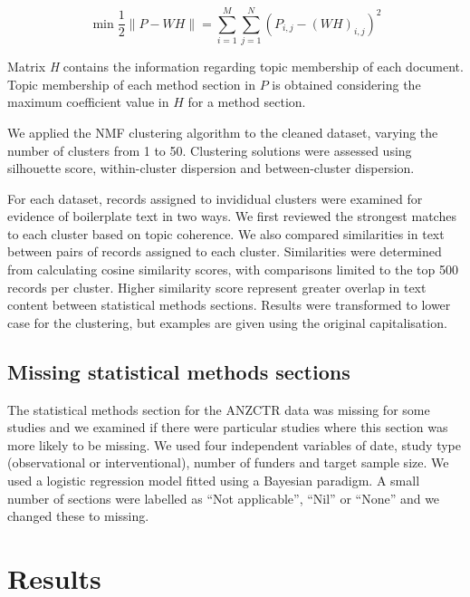 \documentclass[
]{article}
\begin{document}
\begin{equation}
\label{eq:Eq2}
\min \frac{1}{2}\|P - WH\|= \sum _{i=1}^{M}\sum _{j=1}^{N} \left(  P_{i,j} -\left(WH \right)_{i,j} \right)^{2}
\end{equation}

Matrix \textit{H} contains the information regarding topic membership of each document. Topic membership of each method section in \(P\) is obtained considering the maximum coefficient value in \(H\) for a method section.

We applied the NMF clustering algorithm to the cleaned dataset, varying the number of clusters from 1 to 50. Clustering solutions were assessed using silhouette score, within-cluster dispersion and between-cluster
dispersion.

For each dataset, records assigned to invididual clusters were examined for evidence of boilerplate text in two ways. We first reviewed the strongest matches to each cluster based on topic coherence. We also compared similarities in text between pairs of records assigned to each cluster. Similarities were determined from calculating cosine similarity scores, with comparisons limited to the top 500 records per cluster. Higher similarity score represent greater overlap in text content between statistical methods sections. Results were transformed to lower case for the clustering, but examples are given using the original capitalisation.

\hypertarget{missing-statistical-methods-sections}{%
\subsection{Missing statistical methods sections}\label{missing-statistical-methods-sections}}

The statistical methods section for the ANZCTR data was missing for some studies and we examined if there were particular studies where this section was more likely to be missing.
We used four independent variables of date, study type (observational or interventional), number of funders and target sample size.
We used a logistic regression model fitted using a Bayesian paradigm. A small number of sections were labelled as ``Not applicable'', ``Nil'' or ``None'' and we changed these to missing.

\hypertarget{results}{%
\section{Results}\label{results}}
\end{document}

